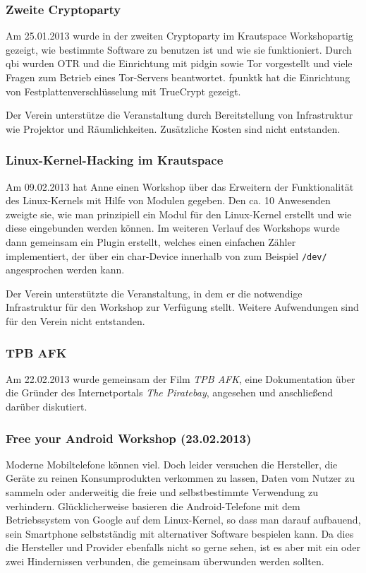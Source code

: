 \documentclass[10pt,DIV16]{scrartcl}
\begin{document}
\subsubsection{Zweite Cryptoparty}

Am 25.01.2013 wurde in der zweiten Cryptoparty im Krautspace
Workshopartig gezeigt, wie bestimmte Software zu benutzen ist und wie
sie funktioniert. Durch qbi wurden OTR und die Einrichtung mit pidgin
sowie Tor vorgestellt und viele Fragen zum Betrieb eines Tor-Servers
beantwortet. fpunktk hat die Einrichtung von Festplattenverschlüsselung
mit TrueCrypt gezeigt.

Der Verein unterstütze die Veranstaltung durch Bereitstellung von
Infrastruktur wie Projektor und Räumlichkeiten. Zusätzliche Kosten sind
nicht entstanden.

\subsubsection{Linux-Kernel-Hacking im Krautspace}

Am 09.02.2013 hat Anne einen Workshop über das Erweitern der
Funktionalität des Linux-Kernels mit Hilfe von Modulen gegeben. Den ca.
10 Anwesenden zweigte sie, wie man prinzipiell ein Modul für den
Linux-Kernel erstellt und wie diese eingebunden werden können. Im
weiteren Verlauf des Workshops wurde dann gemeinsam ein Plugin
erstellt, welches einen einfachen Zähler implementiert, der über ein
char-Device innerhalb von zum Beispiel \texttt{/dev/} angesprochen
werden kann.

Der Verein unterstützte die Veranstaltung, in dem er die notwendige
Infrastruktur für den Workshop zur Verfügung stellt. Weitere
Aufwendungen sind für den Verein nicht entstanden.

\subsubsection{TPB AFK}

Am 22.02.2013 wurde gemeinsam der Film \textit{TPB AFK}, eine
Dokumentation über die Gründer des Internetportals \textit {The
Piratebay}, angesehen und anschließend darüber diskutiert.


\subsubsection{Free your Android Workshop (23.02.2013)}
\label{sec:free-your-android}

Moderne Mobiltelefone können viel. Doch leider versuchen die Hersteller,
die Geräte zu reinen Konsumprodukten verkommen zu lassen, Daten vom
Nutzer zu sammeln oder anderweitig die freie und selbstbestimmte
Verwendung zu verhindern. Glücklicherweise basieren die
Android-Telefone mit dem Betriebssystem von Google auf dem
Linux-Kernel, so dass man darauf aufbauend, sein Smartphone
selbstständig mit alternativer Software bespielen kann. Da dies die
Hersteller und Provider ebenfalls nicht so gerne sehen, ist es
aber mit ein oder zwei Hindernissen verbunden, die gemeinsam
überwunden werden sollten.
\end{document}
